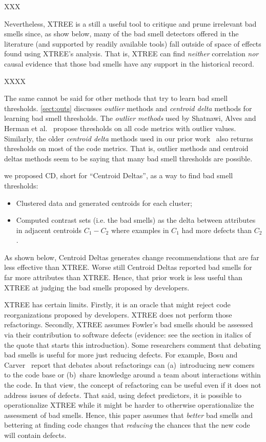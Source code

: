 \documentclass{sig-alternate}
\newcommand{\tion}[1]{\textsection\ref{sect:#1}}
\begin{document}
XXX


Nevertheless, XTREE is a still a useful tool to critique and prune
irrelevant bad smells since, 
as show below, many of the bad smell detectors offered
in the literature (and supported by readily available tools)
fall outside of  space of
effects found  using XTREE's analysis.
That is,   XTREE can find 
{\em neither} correlation {\em nor}
causal evidence that those bad smells
have any support   in the historical record. 

XXXX

The same cannot be said for other methods that try to learn
bad smell thresholds. \tion{outs}
discusses {\em outlier} methods and {\em centroid delta} methods
for learning bad smell thresholds.
The {\em  outlier methods}  used by
Shatnawi, Alves and Herman et al.~\cite{Shatnawi10,Alves2010,hermans15}
propose thresholds on all code metrics with outlier values.
Similarly, the older {\em centroid delta} methods  used in our 
prior work~\cite{me12c} also returns thresholds on most of the code
metrics. That is, outlier methods and centroid deltas methods
seem to be saying that many bad smell thresholds are possible.


we proposed CD, short for
``Centroid Deltas'', as a way to find bad smell thresholds:
\begin{itemize}
    \item Clustered
data and generated centroids for each cluster;
\item Computed contrast sets (i.e. the bad smells)
as the delta between attributes in adjacent centroids $C_1 - C_2$
where examples in $C_1$ had more defects than $C_2$.
\end{itemize}
As shown below, Centroid Deltas
generates change
recommendations that are far less effective than XTREE.
Worse still Centroid Deltas reported bad smells
for far more attributes than XTREE. Hence, that prior work
is less useful than XTREE at judging the  bad smells proposed by developers.

 

XTREE   has certain limits. Firstly, it is an oracle that  might reject code reorganizations proposed
by developers. XTREE does not perform those refactorings.
Secondly, XTREE assumes   Fowler's bad smells
should be assessed via their contribution to software defects
(evidence: see the section in italics of the quote
that starts this introduction). Some researchers 
 comment that   debating bad smells is  useful for more just reducing defects. For example, Bosu and Carver~\cite{bosu13} report that
debates about refactorings can   (a)~introducing new comers to the code base or (b)~share knowledge around a team
about interactions within the code. In that view, 
the concept of refactoring can be useful
even if it does not address issues of defects. 
That said, using
defect predictors,
it is possible to operationalize XTREE
while it might be harder to otherwise operationalize the assessment of bad smells.
Hence, 
this paper assumes that {\em better} bad smells and
bettering at finding code changes that  {\em reducing} the chances
that the new code will contain defects. 
\end{document}

